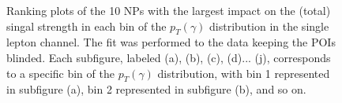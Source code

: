 \begin{figure}[ht]
  \quad
  \quad
  \quad

  \caption{Ranking plots of the 10 NPs with the largest impact on the \tty (total) singal strength in each bin of the $p_T(\gamma)$ distribution in the single 
  lepton channel. The fit was performed to the data keeping the POIs blinded. Each subfigure, labeled (a), (b), (c), (d)... (j), corresponds to a specific bin 
  of the $p_T(\gamma)$ distribution, with bin 1 represented in subfigure (a), bin 2 represented in 
  subfigure (b), and so on.}
  \label{fig:ranking_ljet_total_mu_blinded}
\end{figure}
\FloatBarrier


